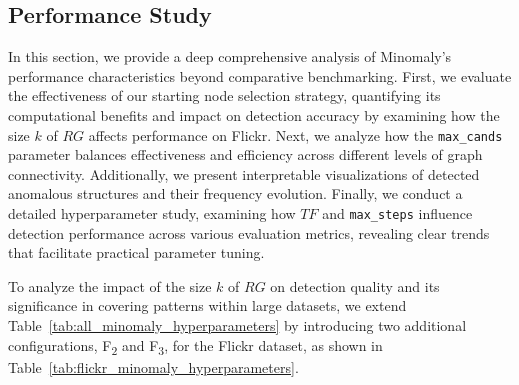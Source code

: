 \documentclass[pdflatex,sn-mathphys-num]{sn-jnl}%
\theoremstyle{thmstyleone}%
\theoremstyle{thmstyletwo}%
\theoremstyle{thmstylethree}%
\begin{document}
\subsection{Performance Study}


In this section, we provide a deep comprehensive analysis of Minomaly's performance characteristics beyond comparative benchmarking. First, we evaluate the effectiveness of our starting node selection strategy, quantifying its computational benefits and impact on detection accuracy by examining how the size $k$ of $RG$ affects performance on Flickr. Next, we analyze how the \texttt{max\_cands} parameter balances effectiveness and efficiency across different levels of graph connectivity. Additionally, we present interpretable visualizations of detected anomalous structures and their frequency evolution. Finally, we conduct a detailed hyperparameter study, examining how $TF$ and \texttt{max\_steps} influence detection performance across various evaluation metrics, revealing clear trends that facilitate practical parameter tuning.

To analyze the impact of the size $k$ of $RG$ on detection quality and its significance in covering patterns within large datasets, we extend Table~\ref{tab:all_minomaly_hyperparameters} by introducing two additional configurations, F\textsubscript{2} and F\textsubscript{3}, for the Flickr dataset, as shown in Table~\ref{tab:flickr_minomaly_hyperparameters}.
\end{document}
